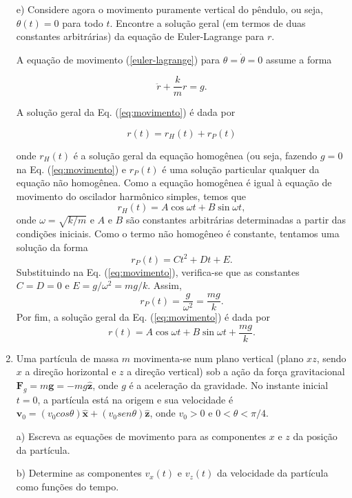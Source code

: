 \begin{enumerate}[start=1,label={\bfseries Q\arabic*.}]
e) Considere agora o movimento puramente vertical do pêndulo, ou seja, $\theta(t) = 0$ para todo $t$. Encontre a solução geral (em termos de duas constantes arbitrárias) da equação de Euler-Lagrange para $r$.

\resposta A equação de movimento (\ref{euler-lagrange}) para $\theta = \dot{\theta} = 0$ assume a forma

\begin{equation}\label{eq:movimento}
\ddot{r} + \frac{k}{m} r = g.
\end{equation}

A solução geral da Eq. (\ref{eq:movimento}) é dada por

$$
r(t) = r_{H}(t) + r_{P}(t)
$$

onde $r_{H}(t)$ é a solução geral da equação homogênea (ou seja, fazendo $g = 0$ na Eq. (\ref{eq:movimento}) e $r_{P}(t)$ é uma solução particular qualquer da equação não homogênea. Como a equação homogênea é igual à equação de movimento do oscilador harmônico simples, temos que
$$
r_{H}(t) = A \cos \omega t + B \sin \omega t,
$$
onde $\omega = \sqrt{k/m}$ e $A$ e $B$ são constantes arbitrárias determinadas a partir das condições iniciais. Como o termo não homogêneo é constante, tentamos uma solução da forma
$$
r_{P}(t) = Ct^{2} + Dt + E.
$$
Substituindo na Eq. (\ref{eq:movimento}), verifica-se que as constantes $C = D = 0$ e $E = g/\omega^{2} = mg/k$. Assim,
$$
r_{P}(t) = \frac{g}{\omega^{2}} = \frac{mg}{k}.
$$
Por fim, a solução geral da Eq. (\ref{eq:movimento}) é dada por
$$
r(t) = A \cos \omega t + B \sin \omega t + \frac{mg}{k}.
$$








\item Uma partícula de massa $m$  movimenta-se num plano vertical (plano $xz$, sendo $x$ a direção horizontal e $z$ a direção vertical) sob a ação da força gravitacional $\mathbf{F}_{g} = m \mathbf{g} = - m g \hat{\mathbf{z}}$, onde $g$ é a aceleração da gravidade. No instante inicial $t=0$, a partícula está na origem e sua velocidade é $\mathbf{v}_{0} = (v_{0} cos \theta) \hat{\mathbf{x}} + (v_{0} sen \theta) \hat{\mathbf{z}}$, onde $v_{0} > 0$ e $0 < \theta < \pi/4$.



a) Escreva as equações de movimento para as componentes $x$ e $z$ da posição da partícula.

\resposta

b) Determine as componentes $v_{x}(t)$ e $v_{z}(t)$ da velocidade da partícula como funções do tempo.


\end{enumerate}
